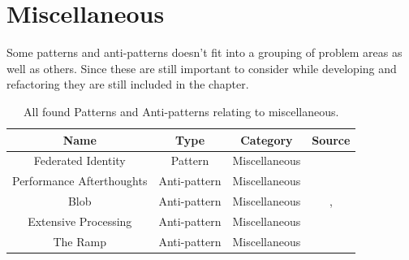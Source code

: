 \documentclass[a4paper,UKenglish]{dagrep}
\begin{document}
\section{Miscellaneous}
Some patterns and  anti-patterns doesn't fit into a grouping of problem areas as well as others. Since these are still important to consider while developing and refactoring they are still included in the chapter.


\begin{table}[H]
	\begin{tabular}{c|ccc}
		Name                       & Type    & Category           & Source                                    \\\hline
		Federated Identity         & Pattern & Miscellaneous      & \cite{microsoft2024performanceefficiency} \\
		Performance Afterthoughts         & Anti-pattern & Miscellaneous      & \cite{tate2002bitter}                                   \\
		Blob                              & Anti-pattern & Miscellaneous      & \cite{detect_antipatterns},\cite{brown1998antipatterns} \\
		Extensive Processing              & Anti-pattern & Miscellaneous      & \cite{detect_antipatterns}                              \\%
		The Ramp                          & Anti-pattern & Miscellaneous      & \cite{detect_antipatterns}                              \\
	\end{tabular}
	\caption{All found Patterns and Anti-patterns relating to miscellaneous.}
	\label{tab:antipatterns}
\end{table}
\end{document}
